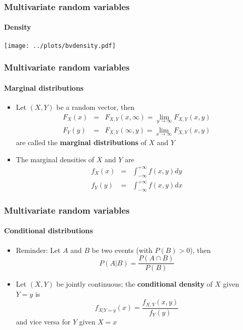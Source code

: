 \documentclass[notes=show]{beamer}
\begin{document}
\begin{frame}\frametitle{Multivariate random variables}\framesubtitle{Density}
\begin{center}
    \texttt{[image: ../plots/bvdensity.pdf]}
\end{center}
\end{frame}


\begin{frame}\frametitle{Multivariate random variables}\framesubtitle{Marginal distributions}
\begin{itemize}
    \item Let $\left( X,Y\right) $ be a random vector, then%
    \begin{eqnarray*}
        F_{X}(x) &=&F_{X,Y}(x,\infty )=\lim_{y\rightarrow \infty }F_{X,Y}(x,y) \\
        F_{Y}(y) &=&F_{X,Y}(\infty ,y)=\lim_{x\rightarrow \infty }F_{X,Y}(x,y)
    \end{eqnarray*}%
    are called the \textbf{marginal distributions} of $X$ and $Y$
    \item The marginal densities of $X$ and $Y$ are
    \begin{eqnarray*}
        f_{X}(x) &=&\int_{-\infty }^{+\infty }f(x,y)dy \\
        f_{Y}(y) &=&\int_{-\infty }^{+\infty }f(x,y)dx
    \end{eqnarray*}
\end{itemize}
\end{frame}


\begin{frame}\frametitle{Multivariate random variables}\framesubtitle{Conditional distributions}
\begin{itemize}
    \item Reminder: Let $A$ and $B$ be two events (with $P(B)>0$), then%
    \begin{equation*}
        P(A|B)=\frac{P(A\cap B)}{P(B)}
    \end{equation*}
    \item Let $\left( X,Y\right) $ be jointly continuous; the \textbf{conditional density }of $X$ given $Y=y$ is
    \begin{equation*}
        f_{X|Y=y}(x)=\frac{f_{X,Y}(x,y)}{f_{Y}(y)}
    \end{equation*}
    and vice versa for $Y$ given $X=x$
\end{itemize}
\end{frame}
\end{document}

